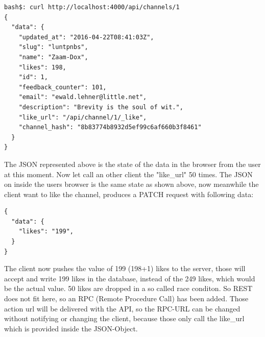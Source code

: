 \begin{lstlisting}
bash$: curl http://localhost:4000/api/channels/1
{
  "data": {
    "updated_at": "2016-04-22T08:41:03Z",
    "slug": "luntpnbs",
    "name": "Zaam-Dox",
    "likes": 198,
    "id": 1,
    "feedback_counter": 101,
    "email": "ewald.lehner@little.net",
    "description": "Brevity is the soul of wit.",
    "like_url": "/api/channel/1/_like",
    "channel_hash": "8b83774b8932d5ef99c6af660b3f8461"
  }
}
\end{lstlisting}
The JSON represented above is the state of the data in the browser from the user at this moment. Now let call an other client the "like\_url" 50 times. The JSON on inside the users browser is the same state as shown above, now meanwhile the client want to like the channel, produces a PATCH request with following data:
\begin{lstlisting}
{
  "data": {
    "likes": "199",
  }
}
\end{lstlisting}
The client now pushes the value of 199 (198+1) likes to the server, those will accept and write 199 likes in the database, instead of the 249 likes, which would be the actual value. 50 likes are dropped in a so called race conditon. 
 So REST does not fit here, so an RPC (Remote Procedure Call) has been added. Those action url will be delivered with the API, so the RPC-URL can be changed without notifying or changing the client, because those only call the like\_url which is provided inside the JSON-Object.  


